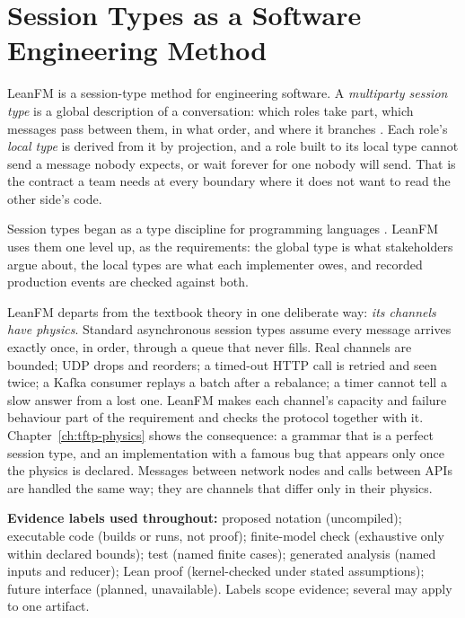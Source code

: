 \chapter{Session Types as a Software Engineering Method}
\label{ch:vision}

LeanFM is a session-type method for engineering software. A \emph{multiparty
session type} is a global description of a conversation: which roles take part,
which messages pass between them, in what order, and where it branches
\citep{honda2008multiparty}. Each role's \emph{local type} is derived from it by
projection, and a role built to its local type cannot send a message nobody
expects, or wait forever for one nobody will send. That is the contract a team
needs at every boundary where it does not want to read the other side's code.

Session types began as a type discipline for programming languages
\citep{honda1993types,honda1998language}. LeanFM uses them one level up, as the
requirements: the global type is what stakeholders argue about, the local types
are what each implementer owes, and recorded production events are checked
against both.

LeanFM departs from the textbook theory in one deliberate way: \emph{its channels
have physics}. Standard asynchronous session types assume every message arrives
exactly once, in order, through a queue that never fills. Real channels are
bounded; UDP drops and reorders; a timed-out HTTP call is retried and seen
twice; a Kafka consumer replays a batch after a rebalance; a timer cannot tell a
slow answer from a lost one. LeanFM makes each channel's capacity and failure
behaviour part of the requirement and checks the protocol together with it.
Chapter~\ref{ch:tftp-physics} shows the consequence: a grammar that is a perfect
session type, and an implementation with a famous bug that appears only once the
physics is declared. Messages between network nodes and calls between APIs are
handled the same way; they are channels that differ only in their physics.

\noindent\textbf{Evidence labels used throughout:} proposed notation (uncompiled);
executable code (builds or runs, not proof); finite-model check (exhaustive only
within declared bounds); test (named finite cases); generated analysis (named
inputs and reducer); Lean proof (kernel-checked under stated assumptions); future
interface (planned, unavailable). Labels scope evidence; several may apply to one
artifact.

